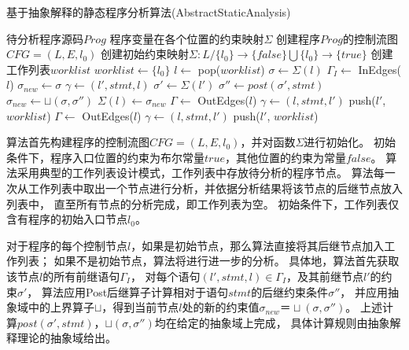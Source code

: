 \begin{algorithm}[h]
\renewcommand{\algorithmicrequire}{\textbf{Input:}}
\renewcommand{\algorithmicensure}{\textbf{Output:}}
\caption{基于抽象解释的静态程序分析算法(AbstractStaticAnalysis)}
\label{algo-absint-analysis}
\begin{algorithmic}[1]
\REQUIRE 待分析程序源码$Prog$
\ENSURE 程序变量在各个位置的约束映射$\Sigma$
\STATE 创建程序$Prog$的控制流图$CFG=(L, E, l_0)$
\STATE 创建初始约束映射$\Sigma : L/\{l_0\} \rightarrow \{false\} \bigcup \{l_0\} \rightarrow \{true\}$
\STATE 创建工作列表$worklist$
\STATE $worklist \gets \{l_{0}\}$
	\STATE $l \gets $ pop($worklist$)
	\STATE $\sigma \gets \Sigma(l)$
		\STATE $\Gamma_I \gets $ InEdges($l$)
		\STATE $\sigma_{new} \gets \sigma$
			\STATE $\gamma \gets (l',stmt,l)$
			\STATE $\sigma' \gets \Sigma(l')$
			\STATE $\sigma'' \gets post(\sigma', stmt)$
			\STATE $\sigma_{new} \gets \sqcup(\sigma, \sigma'')$
		\ENDFOR
			\STATE $\Sigma(l) \gets \sigma_{new}$
			\STATE $\Gamma \gets $ OutEdges($l$)
			\FOR{$\gamma \in \Gamma$}
				\STATE $\gamma \gets (l, stmt, l')$
				\STATE push($l'$, $worklist$)
			\ENDFOR
		\ENDIF
	\ELSE
		\STATE $\Gamma \gets $ OutEdges($l$)
		\FOR{$\gamma \in \Gamma$}
			\STATE $\gamma \gets (l, stmt, l')$
			\STATE push($l'$, $worklist$)
		\ENDFOR
	\ENDIF
\ENDWHILE
\end{algorithmic}
\end{algorithm}

算法首先构建程序的控制流图$CFG=(L, E, l_0)$，并对函数$\Sigma$进行初始化。
初始条件下，程序入口位置的约束为布尔常量$true$，其他位置的约束为常量$false$。
算法采用典型的工作列表设计模式，工作列表中存放待分析的程序节点。
算法每一次从工作列表中取出一个节点进行分析，并依据分析结果将该节点的后继节点放入列表中，
直至所有节点的分析完成，即工作列表为空。
初始条件下，工作列表仅含有程序的初始入口节点$l_0$。

对于程序的每个控制节点$l$，如果是初始节点，那么算法直接将其后继节点加入工作列表；
如果不是初始节点，算法将进行进一步的分析。
具体地，算法首先获取该节点$l$的所有前继语句$\Gamma_{I}$，
对每个语句$(l',stmt,l)\in \Gamma_{I}$，及其前继节点$l'$的约束$\sigma'$，
算法应用Post后继算子计算相对于语句$stmt$的后继约束条件$\sigma''$，
并应用抽象域中的上界算子$\sqcup$，得到当前节点$l$处的新的约束值$\sigma_{new}　＝　
\sqcup(\sigma,\sigma'')$。
上述计算$post(\sigma', stmt)$，$\sqcup(\sigma,\sigma'')$均在给定的抽象域上完成，
具体计算规则由抽象解释理论的抽象域给出。

